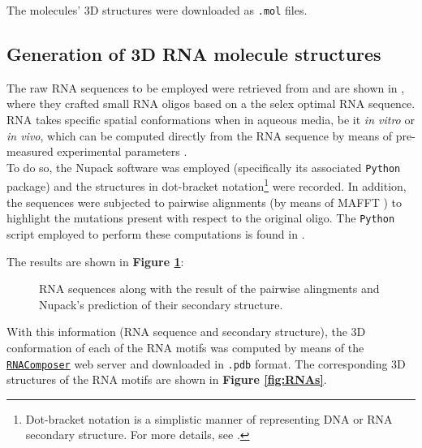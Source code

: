 The molecules' 3D structures were downloaded as \texttt{.mol} files. 

\subsection{Generation of 3D RNA molecule structures}

The raw RNA sequences to be employed were retrieved from \cite{dolcemascolo_2022} and are shown in \textbf{}, where they crafted small RNA oligos based on a the selex optimal RNA sequence. RNA takes specific spatial conformations when in aqueous media, be it \textit{in vitro} or \textit{in vivo}, which can be computed directly from the RNA sequence by means of pre-measured experimental parameters \cite{santalucia_1998}.\\

To do so, the Nupack software was employed \cite{dirks_2004} (specifically its associated \texttt{Python} package) and the structures in dot-bracket notation\footnote{Dot-bracket notation is a simplistic manner of representing DNA or RNA secondary structure. For more details, see \cite{rna_structure_notations}.} were recorded. In addition, the sequences were subjected to pairwise alignments (by means of MAFFT \cite{katoh_2002}) to highlight the mutations present with respect to the original oligo. The \texttt{Python} script employed to perform these computations is found in \textbf{}.

\vfill

\pagebreak

The results are shown in \textbf{Figure \ref{fig:dataset}}:

\begin{figure}[htbp!]
    
    \caption{RNA sequences along with the result of the pairwise alingments and Nupack's prediction of their secondary structure.}
    \label{fig:dataset}
\end{figure}

With this information (RNA sequence and secondary structure), the 3D conformation of each of the RNA motifs was computed by means of the \href{https://rnacomposer.cs.put.poznan.pl/}{\texttt{RNAComposer}} web server \cite{biesiada_2016} and downloaded in \texttt{.pdb} format. The corresponding 3D structures of the RNA motifs are shown in \textbf{Figure \ref{fig:RNAs}}.

